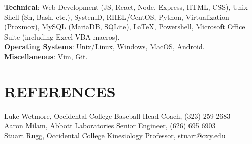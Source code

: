 \documentclass[margin]{res}
\begin{document}
\begin{resume}
\textbf{Technical}: Web Development (JS, React, Node, Express, HTML, CSS), Unix Shell (Sh, Bash, etc.), SystemD, RHEL/CentOS, Python, Virtualization (Proxmox), MySQL (MariaDB, SQLite), \LaTeX, Powershell, Microsoft Office Suite (including Excel VBA macros).
\\
\textbf{Operating Systems}: Unix/Linux, Windows, MacOS, Android.
\\
\textbf{Miscellaneous}: Vim, Git.

\section{REFERENCES}
Luke Wetmore, Occidental College Baseball Head Coach, (323) 259 2683 \\
Aaron Milam, Abbott Laboratories Senior Engineer, (626) 695 6903 \\
Stuart Rugg, Occidental College Kinesiology Professor, stuart@oxy.edu
\end{resume}
\end{document}

